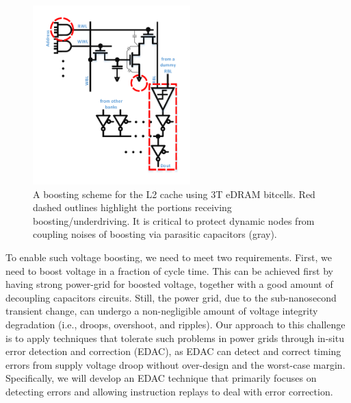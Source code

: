 \begin{figure}
\center
\includegraphics[width=2.4in, trim=20 20 10 50]{./fig/boosting.pdf}
\caption{A boosting scheme for the L2 cache using 3T eDRAM bitcells. Red dashed outlines highlight the portions receiving boosting/underdriving. It is critical to protect dynamic nodes from coupling noises of boosting via parasitic capacitors (gray).}
\label{fig:boosting}
\end{figure}

To enable such voltage boosting, we need to meet two requirements.  First, we need to boost voltage in a fraction of cycle time. 
This can be achieved first by having strong power-grid for boosted voltage, together with a good amount of decoupling capacitors circuits. 
Still, the power grid, due to the sub-nanosecond transient change, can undergo a non-negligible amount of voltage integrity degradation (i.e., droops, overshoot, and ripples). 
Our approach to this challenge is to apply techniques that tolerate such problems in power grids through in-situ error detection and correction (EDAC), as EDAC can detect and correct timing errors from supply voltage droop without over-design and the worst-case margin. Specifically, we will develop an EDAC technique that primarily focuses on detecting errors and allowing instruction replays to deal with error correction.

